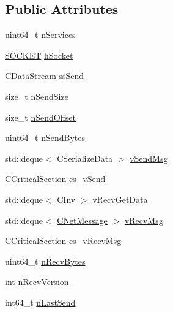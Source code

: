 \subsection*{Public Attributes}
\begin{DoxyCompactItemize}
\item 
uint64\+\_\+t \mbox{\hyperlink{class_c_node_a8259db81211f6837585c6f82f89414ff}{n\+Services}}
\item 
\mbox{\hyperlink{compat_8h_a26ef1173e2f2c0d3db27eca28397d723}{S\+O\+C\+K\+ET}} \mbox{\hyperlink{class_c_node_a7cda6efa6a9ef9db3eebe70fc3bdd45a}{h\+Socket}}
\item 
\mbox{\hyperlink{class_c_data_stream}{C\+Data\+Stream}} \mbox{\hyperlink{class_c_node_a6174b5a3d8d8f6a2daf02be3cf04dc63}{ss\+Send}}
\item 
size\+\_\+t \mbox{\hyperlink{class_c_node_a3c99b7e2b0e53feb58f6859453456f74}{n\+Send\+Size}}
\item 
size\+\_\+t \mbox{\hyperlink{class_c_node_a090bda86de6b84c3db83e1f029d4f453}{n\+Send\+Offset}}
\item 
uint64\+\_\+t \mbox{\hyperlink{class_c_node_a33e24a9544df3c60f9e1ec05b5e91051}{n\+Send\+Bytes}}
\item 
std\+::deque$<$ C\+Serialize\+Data $>$ \mbox{\hyperlink{class_c_node_a68e5fb1a80fe4247aa577a3c9a74b399}{v\+Send\+Msg}}
\item 
\mbox{\hyperlink{sync_8h_a37a4692b2d517f2843655ca11af7668a}{C\+Critical\+Section}} \mbox{\hyperlink{class_c_node_a79edcac83fc5067567c7b41c26fcc56f}{cs\+\_\+v\+Send}}
\item 
std\+::deque$<$ \mbox{\hyperlink{class_c_inv}{C\+Inv}} $>$ \mbox{\hyperlink{class_c_node_a9649c1f27ff0d8f0ba89eb1ea5bee139}{v\+Recv\+Get\+Data}}
\item 
std\+::deque$<$ \mbox{\hyperlink{class_c_net_message}{C\+Net\+Message}} $>$ \mbox{\hyperlink{class_c_node_a015361812daa5b6ebb9a5692ddf67a54}{v\+Recv\+Msg}}
\item 
\mbox{\hyperlink{sync_8h_a37a4692b2d517f2843655ca11af7668a}{C\+Critical\+Section}} \mbox{\hyperlink{class_c_node_abaebfaf8fff7e2e99366ae2bc69af6cd}{cs\+\_\+v\+Recv\+Msg}}
\item 
uint64\+\_\+t \mbox{\hyperlink{class_c_node_a8bbe2a7052476d62acf7f0a5a9c5981b}{n\+Recv\+Bytes}}
\item 
int \mbox{\hyperlink{class_c_node_ab7494353448b922accfb645bd26ac271}{n\+Recv\+Version}}
\item 
int64\+\_\+t \mbox{\hyperlink{class_c_node_af39253ad525733ca64ab3fc785dfc4eb}{n\+Last\+Send}}

\end{DoxyCompactItemize}
